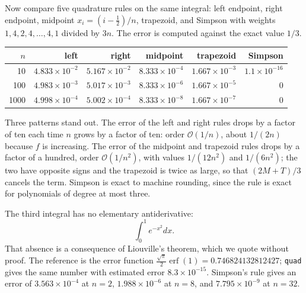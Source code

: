 Now compare five quadrature rules on the same integral: left endpoint, right
endpoint, midpoint $x_i=(i-\frac12)/n$, trapezoid, and Simpson with weights
$1,4,2,4,\dots,4,1$ divided by $3n$. The error is computed against the exact value $1/3$.

\begin{center}\small
\begin{tabular}{rrrrrr}
\hline
$n$ & left & right & midpoint & trapezoid & Simpson \\
\hline
10 & $4.833\times10^{-2}$ & $5.167\times10^{-2}$ & $8.333\times10^{-4}$
   & $1.667\times10^{-3}$ & $1.1\times10^{-16}$ \\
100 & $4.983\times10^{-3}$ & $5.017\times10^{-3}$ & $8.333\times10^{-6}$
   & $1.667\times10^{-5}$ & $0$ \\
1000 & $4.998\times10^{-4}$ & $5.002\times10^{-4}$ & $8.333\times10^{-8}$
   & $1.667\times10^{-7}$ & $0$ \\
\hline
\end{tabular}
\end{center}

Three patterns stand out. The error of the left and right rules drops by a factor of ten each time $n$ grows
by a factor of ten: order $\mathcal{O}(1/n)$, about $1/(2n)$ because $f$ is increasing. The error of the midpoint
and trapezoid rules drops by a factor of a hundred, order $\mathcal{O}(1/n^2)$, with values
$1/(12n^2)$ and $1/(6n^2)$; the two have opposite signs and the trapezoid is twice as large,
so that $(2M+T)/3$ cancels the term. Simpson is exact to machine rounding, since the
rule is exact for polynomials of degree at most three.

The third integral has no elementary antiderivative:
\[
\int_0^1 e^{-x^2}dx .
\]
That absence is a consequence of Liouville's theorem, which we quote without proof. The reference
is the error function $\frac{\sqrt{\pi}}{2}\operatorname{erf}(1)=0.746824132812427$; \texttt{quad} gives
the same number with estimated error $8.3\times10^{-15}$. Simpson's rule gives an error of
$3.563\times10^{-4}$ at $n=2$, $1.988\times10^{-6}$ at $n=8$, and
$7.795\times10^{-9}$ at $n=32$.


